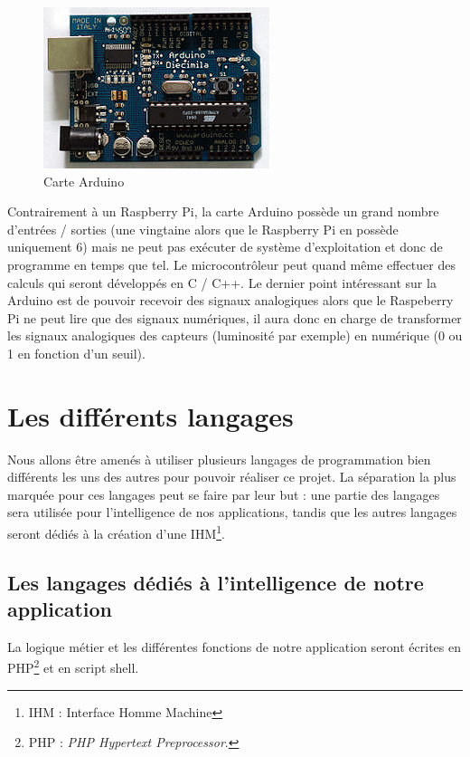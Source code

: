 \begin{figure}
  	\centering
  	\includegraphics[scale= 0.6]{images/Arduino.jpg}
  	\caption{Carte Arduino}
\end{figure}

Contrairement à un Raspberry Pi, la carte Arduino possède un grand nombre d'entrées / sorties (une vingtaine alors que le Raspberry Pi en possède uniquement 6) mais ne peut pas exécuter de système d'exploitation et donc de programme en temps que tel. Le microcontrôleur peut quand même effectuer des calculs qui seront développés en C / C++. Le dernier point intéressant sur la Arduino est de pouvoir recevoir des signaux analogiques alors que le Raspeberry Pi ne peut lire que des signaux numériques, il aura donc en charge de transformer les signaux analogiques des capteurs (luminosité par exemple) en numérique (0 ou 1 en fonction d'un seuil). \\

\section{Les différents langages} %
\label{sec:les_diff_rents_langages}
Nous allons être amenés à utiliser plusieurs langages de programmation bien différents les uns des autres pour pouvoir réaliser ce projet. La séparation la plus marquée pour ces langages peut se faire par leur but : une partie des langages sera utilisée pour l'intelligence de nos applications, tandis que les autres langages seront dédiés à la création d'une IHM\footnote{IHM : Interface Homme Machine}.

\subsection{Les langages dédiés à l'intelligence de notre application}
La logique métier et les différentes fonctions de notre application seront écrites en PHP\footnote{PHP : \textit{PHP Hypertext Preprocessor}.} et en script shell.\\


